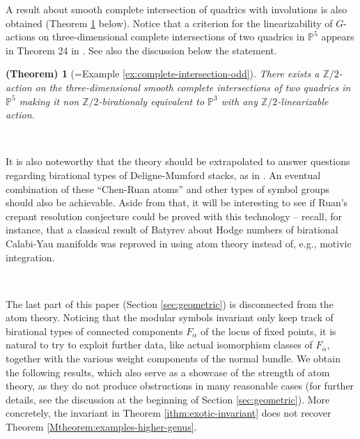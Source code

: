 \documentclass[12pt,a4paper]{amsart}
\newtheorem{Ctheorem}[Mtheorem]{(Theorem)}
\theoremstyle{definition}
\theoremstyle{remark}
\begin{document}
A result about smooth complete intersection of quadrics with involutions is also obtained (Theorem \ref{thm:complete-intersection} below). Notice that a criterion for the linearizability of $G$-actions on three-dimensional complete intersections of two quadrics in $\mathbb P^5$ appears in Theorem 24 in \cite{Hassett2022}. See also the discussion below the statement.

\begin{Ctheorem}[=Example \ref{ex:complete-intersection-odd}]\label{thm:complete-intersection}
    There exists a $\mathbb Z/2$-action on the three-dimensional smooth complete intersections of two quadrics in $\mathbb P^5$ making it non $\mathbb Z/2$-birationaly equivalent to $\mathbb P^3$ with any $\mathbb Z/2$-linearizable action.
\end{Ctheorem}

\ 

It is also noteworthy that the theory should be extrapolated to answer questions regarding birational types of Deligne-Mumford stacks, as in \cites{kresch2019birational, kresch2023birational}. An eventual combination of these ``Chen-Ruan atoms'' and other types of symbol groups should also be achievable. Aside from that, it will be interesting to see if Ruan’s crepant resolution
conjecture \cite{ bryan2007crepantresolutionconjecture} could be proved with this technology -- recall, for instance, that a classical result of Batyrev \cite[Corollary 6.29]{Batyrev:1997hj} about Hodge numbers of birational Calabi-Yau manifolds was reproved in \cite{katzarkovpantevyu} using atom theory instead of, e.g., motivic integration.

\ 

The last part of this paper (Section \ref{sec:geometric}) is disconnected from the atom theory. Noticing that the modular symbols invariant only keep track of birational types of connected components $F_\alpha$ of the locus of fixed points, it is natural to try to exploit further data, like actual isomorphism classes of $F_\alpha$, together with the various weight components of the normal bundle. We obtain the following results, which also serve as a showcase of the strength of atom theory, as they do not produce obstructions in many reasonable cases (for further details, see the discussion at the beginning of Section \ref{sec:geometric}). More concretely, the invariant in Theorem \ref{ithm:exotic-invariant} does not recover Theorem \ref{Mtheorem:examples-higher-genus}.
\end{document}

